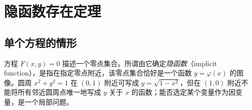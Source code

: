 \documentclass[UTF8,12pt,a4paper,fontset=fandol]{ctexbook}
\begin{document}
\section{隐函数存在定理}
\label{sec:implicit-function-existence-theorem}


\subsection{单个方程的情形}
\label{subsec:implicit-function-for-one-equation}

方程 $F(x,y)=0$ 描述一个零点集合。所谓由它确定\emph{隐函数}（implicit function），是指在指定零点附近，该零点集合恰好是一个函数 $y=\varphi(x)$ 的图像。圆周 $x^2+y^2=1$ 在 $(0,1)$ 附近可写成 $y=\sqrt{1-x^2}$，但在 $(1,0)$ 附近不能将所有邻近圆周点唯一地写成 $y$ 关于 $x$ 的函数；能否选定某个变量作为因变量，是一个局部问题。
\end{document}
